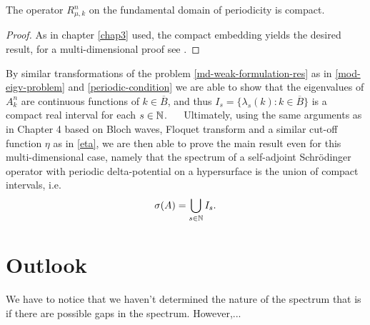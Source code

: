 \begin{theorem}
	The operator $R_{\mu, k}^{n}$ on the fundamental domain of periodicity is compact.	

	\begin{proof}
		As in chapter \ref{chap3} used, the compact embedding yields the desired result, for a multi-dimensional proof see \cite[Chap. 4]{Adams}.	
	\end{proof}
\end{theorem}

By similar transformations of the problem \eqref{md-weak-formulation-res} as in \eqref{mod-eigv-problem} and \eqref{periodic-condition} we are able to show that the eigenvalues of $A^{n}_{k}$ are continuous functions of $k \in \overline{B}$, and thus $I_{s} = \{ \lambda_{s}(k) : k \in \overline{B} \}$ is a compact real interval for each $s \in \mathbb{N}$.
~\newline ~\newline
Ultimately, using the same arguments as in Chapter 4 based on Bloch waves, Floquet transform and a similar cut-off function $\eta$ as in \eqref{eta}, we are then able to prove the main result even for this multi-dimensional case, namely that the spectrum of a self-adjoint Schrödinger operator with periodic delta-potential on a hypersurface is the union of compact intervals, i.e.
	\[ \sigma(A) = \bigcup_{s \in \mathbb{N}} I_{s}. \]

\section{Outlook}	
	
We have to notice that we haven't determined the nature of the spectrum that is if there are possible gaps in the spectrum. However,... %